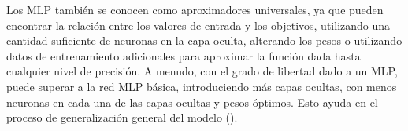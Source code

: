 Los MLP también se conocen como aproximadores universales, ya que pueden encontrar la relación entre los valores de entrada y los objetivos, utilizando una cantidad suficiente de neuronas en la capa oculta, alterando los pesos o utilizando datos de entrenamiento adicionales para aproximar la función dada hasta cualquier nivel de precisión. A menudo, con el grado de libertad dado a un MLP, puede superar a la red MLP básica, introduciendo más capas ocultas, con menos neuronas en cada una de las capas ocultas y pesos óptimos. Esto ayuda en el proceso de generalización general del modelo (\cite{goyal2018Deep}).



